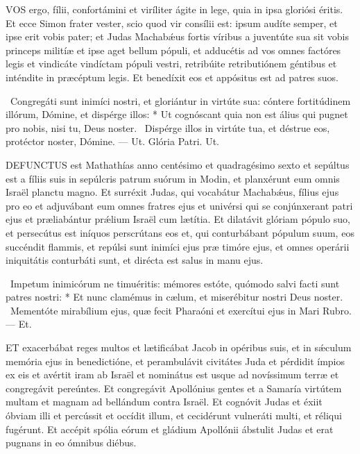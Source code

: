 
\lettrine[lines=2]{V}{OS} ergo, fílii, confortámini et viríliter ágite in lege, quia in ipsa gloriósi éritis. Et ecce Simon frater vester, scio quod vir consílii est: ipsum audíte semper, et ipse erit vobis pater; et Judas Machabǽus fortis víribus a juventúte sua sit vobis princeps militíæ et ipse aget bellum pópuli, et adducétis ad vos omnes factóres legis et vindicáte vindíctam pópuli vestri, retribúite retributiónem géntibus et inténdite in præcéptum legis. Et benedíxit eos et appósitus est ad patres suos.

\R\ Congregáti sunt inimíci nostri, et gloriántur in virtúte sua: cóntere fortitúdinem illórum, Dómine, et dispérge illos: * Ut cognóscant quia non est álius qui pugnet pro nobis, nisi tu, Deus noster. \V\ Dispérge illos in virtúte tua, et déstrue eos, protéctor noster, Dómine. — Ut. Glória Patri. Ut.




\lettrine[lines=2]{D}{EFUNCTUS} est Mathathías anno centésimo et quadragésimo sexto et sepúltus est a fíliis suis in sepúlcris patrum suórum in Modin, et planxérunt eum omnis Israël planctu magno. Et surréxit Judas, qui vocabátur Machabǽus, fílius ejus pro eo et adjuvábant eum omnes fratres ejus et univérsi qui se conjúnxerant patri ejus et præliabántur prǽlium Israël cum lætítia. Et dilatávit glóriam pópulo suo, et persecútus est iníquos perscrútans eos et, qui conturbábant pópulum suum, eos succéndit flammis, et repúlsi sunt inimíci ejus præ timóre ejus, et omnes operárii iniquitátis conturbáti sunt, et dirécta est salus in manu ejus.

\R\ Impetum inimicórum ne timuéritis: mémores estóte, quómodo salvi facti sunt patres nostri: * Et nunc clamémus in cælum, et miserébitur nostri Deus noster. \V\ Mementóte mirabílium ejus, quæ fecit Pharaóni et exercítui ejus in Mari Rubro. — Et.


\lettrine[lines=2]{E}{T} exacerbábat reges multos et lætificábat Jacob in opéribus suis, et in sǽculum memória ejus in benedictióne, et perambulávit civitátes Juda et pérdidit ímpios ex eis et avértit iram ab Israël et nominátus est usque ad novíssimum terræ et congregávit pereúntes. Et congregávit Apollónius gentes et a Samaría virtútem multam et magnam ad bellándum contra Israël. Et cognóvit Judas et éxiit óbviam illi et percússit et occídit illum, et cecidérunt vulneráti multi, et réliqui fugérunt. Et accépit spólia eórum et gládium Apollónii ábstulit Judas et erat pugnans in eo ómnibus diébus.

